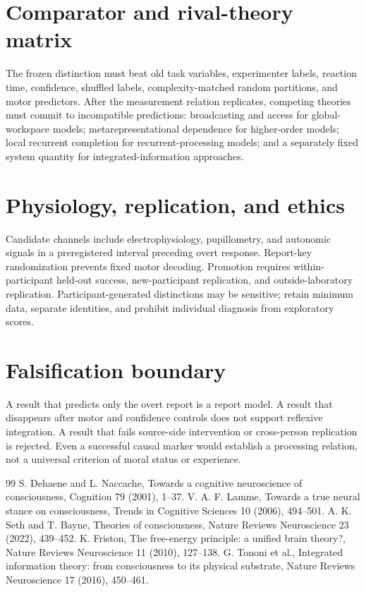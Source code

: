 \documentclass[11pt,a4paper]{article}
\begin{document}
\section{Comparator and rival-theory matrix}
The frozen distinction must beat old task variables, experimenter labels, reaction time, confidence, shuffled labels, complexity-matched random partitions, and motor predictors. After the measurement relation replicates, competing theories must commit to incompatible predictions: broadcasting and access for global-workspace models; metarepresentational dependence for higher-order models; local recurrent completion for recurrent-processing models; and a separately fixed system quantity for integrated-information approaches.

\section{Physiology, replication, and ethics}
Candidate channels include electrophysiology, pupillometry, and autonomic signals in a preregistered interval preceding overt response. Report-key randomization prevents fixed motor decoding. Promotion requires within-participant held-out success, new-participant replication, and outside-laboratory replication. Participant-generated distinctions may be sensitive; retain minimum data, separate identities, and prohibit individual diagnosis from exploratory scores.

\section{Falsification boundary}
A result that predicts only the overt report is a report model. A result that disappears after motor and confidence controls does not support reflexive integration. A result that fails source-side intervention or cross-person replication is rejected. Even a successful causal marker would establish a processing relation, not a universal criterion of moral status or experience.

\begin{thebibliography}{99}
 S. Dehaene and L. Naccache, Towards a cognitive neuroscience of consciousness, Cognition 79 (2001), 1--37.
 V. A. F. Lamme, Towards a true neural stance on consciousness, Trends in Cognitive Sciences 10 (2006), 494--501.
 A. K. Seth and T. Bayne, Theories of consciousness, Nature Reviews Neuroscience 23 (2022), 439--452.
 K. Friston, The free-energy principle: a unified brain theory?, Nature Reviews Neuroscience 11 (2010), 127--138.
 G. Tononi et al., Integrated information theory: from consciousness to its physical substrate, Nature Reviews Neuroscience 17 (2016), 450--461.
\end{thebibliography}
\end{document}
